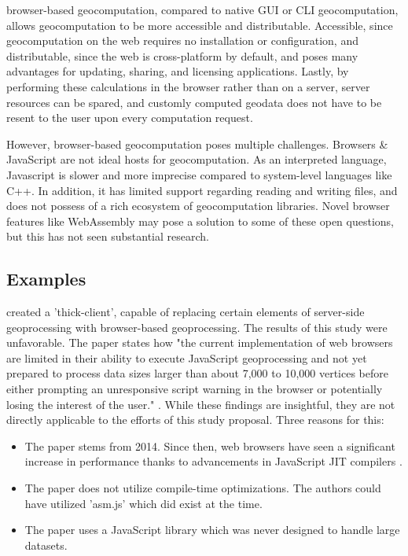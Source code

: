 browser-based geocomputation, compared to native GUI or CLI geocomputation, allows geocomputation to be more accessible and distributable. 
Accessible, since geocomputation on the web requires no installation or configuration, 
and distributable, since the web is cross-platform by default, and poses many advantages for updating, sharing, and licensing applications. 
Lastly, by performing these calculations in the browser rather than on a server, server resources can be spared, 
and customly computed geodata does not have to be resent to the user upon every computation request.

However, browser-based geocomputation poses multiple challenges. 
Browsers \& JavaScript are not ideal hosts for geocomputation. 
As an interpreted language, Javascript is slower and more imprecise compared to system-level languages like C++.
In addition, it has limited support regarding reading and writing files, and does not possess of a rich ecosystem of geocomputation libraries.  
Novel browser features like WebAssembly may pose a solution to some of these open questions, but this has not seen substantial research. 

\subsection{Examples}

\citet{hamilton_client-side_2014} created a 'thick-client', capable of replacing certain elements of server-side geoprocessing with browser-based geoprocessing. 
The results of this study were unfavorable. 
The paper states how "the current implementation of web browsers are limited in their ability to execute JavaScript geoprocessing and not yet prepared to process data sizes larger than about 7,000 to 10,000 vertices before either prompting an unresponsive script warning in the browser or potentially losing the interest of the user." \citep{hamilton_client-side_2014}. 
While these findings are insightful, they are not directly applicable to the efforts of this study proposal. Three reasons for this:

\begin{itemize}
  \item The paper stems from 2014. Since then, web browsers have seen a significant increase in performance thanks to advancements in JavaScript JIT compilers \citep{haas_bringing_2017, kulawiak_analysis_2019}. 
  \item The paper does not utilize compile-time optimizations. The authors could have utilized 'asm.js' \citep{mozilla_asmjs_2013} which did exist at the time. 
  \item The paper uses a JavaScript library which was never designed to handle large datasets.
\end{itemize}

